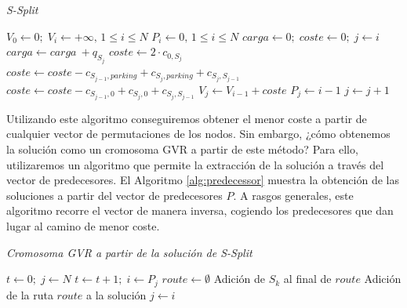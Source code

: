 \begin{algorithm}[!b]
    \caption{\textit{S-Split}}
    \label{alg:ssplit}
    \begin{algorithmic}
        \State $V_0\leftarrow0;\;V_i\leftarrow+\infty,\,1\leq i\leq N$
        \State $P_i\leftarrow0,\,1\leq i\leq N$
            \State $carga\leftarrow0;\;coste\leftarrow0;\;j\leftarrow i$
                \State $carga\leftarrow carga\ + q_{S_j}$
                    \State $coste\leftarrow 2\cdot c_{0,S_j}$
                \Else
                        \State $coste \leftarrow coste - c_{S_{j-1},parking} + c_{S_{j},parking} + c_{S_j,S_{j-1}}$
                    \Else
                        \State $coste \leftarrow coste - c_{S_{j-1},0} + c_{S_{j},0} + c_{S_j,S_{j-1}}$
                    \EndIf
                \EndIf
                        \State $V_j\leftarrow V_{i-1}+coste$
                        \State $P_j\leftarrow i-1$
                    \EndIf
                    $j\leftarrow j+1$
                \EndIf
            \EndWhile
        \EndFor
    \end{algorithmic}
\end{algorithm}

Utilizando este algoritmo conseguiremos obtener el menor coste a partir de cualquier vector de permutaciones de los nodos. Sin embargo, ¿cómo obtenemos la solución como un cromosoma GVR a partir de este método? Para ello, utilizaremos un algoritmo que permite la extracción de la solución a través del vector de predecesores. El Algoritmo \ref{alg:predecessor} muestra la obtención de las soluciones a partir del vector de predecesores $P$. A rasgos generales, este algoritmo recorre el vector de manera inversa, cogiendo los predecesores que dan lugar al camino de menor coste.
\begin{algorithm}[!t]
    \caption{\textit{Cromosoma GVR a partir de la solución de S-Split}}
    \label{alg:predecessor}
    \begin{algorithmic}
        \State $t\leftarrow0;\;j\leftarrow N$
        \Repeat
            \State $t\leftarrow t+1;\;i\leftarrow P_{j}$
            \State $route\leftarrow \emptyset$
                \State Adición de $S_k$ al final de $route$
            \EndFor
            \State Adición de la ruta $route$ a la solución
            \State $j\leftarrow i$
    \end{algorithmic}
\end{algorithm}


